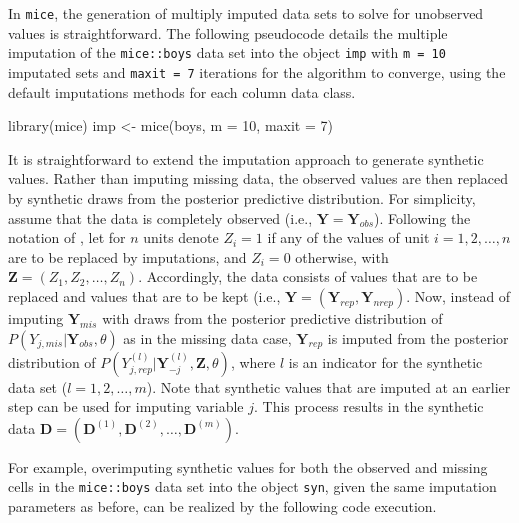 \documentclass[psych,article,submit,moreauthors,pdftex]{mdpi}
\newenvironment{Shaded}{\begin{snugshade}}{\end{snugshade}}
\newcommand{\AttributeTok}[1]{\textcolor[rgb]{0.77,0.63,0.00}{#1}}
\newcommand{\DecValTok}[1]{\textcolor[rgb]{0.00,0.00,0.81}{#1}}
\newcommand{\FunctionTok}[1]{\textcolor[rgb]{0.00,0.00,0.00}{#1}}
\newcommand{\NormalTok}[1]{#1}
\newcommand{\OtherTok}[1]{\textcolor[rgb]{0.56,0.35,0.01}{#1}}
\begin{document}
In \texttt{mice}, the generation of multiply imputed data sets to solve
for unobserved values is straightforward. The following pseudocode
details the multiple imputation of the \texttt{mice::boys} data set
\citep{fredriks_boys_2000} into the object \texttt{imp} with
\texttt{m\ =\ 10} imputated sets and \texttt{maxit\ =\ 7} iterations for
the algorithm to converge, using the default imputations methods for
each column data class.

\begin{Shaded}
\begin{Highlighting}[]
\FunctionTok{library}\NormalTok{(mice)}
\NormalTok{imp }\OtherTok{\textless{}{-}} \FunctionTok{mice}\NormalTok{(boys, }
            \AttributeTok{m =} \DecValTok{10}\NormalTok{,}
            \AttributeTok{maxit =} \DecValTok{7}\NormalTok{)}
\end{Highlighting}
\end{Shaded}

It is straightforward to extend the imputation approach to generate
synthetic values. Rather than imputing missing data, the observed values
are then replaced by synthetic draws from the posterior predictive
distribution. For simplicity, assume that the data is completely
observed (i.e., \(\textbf{Y} = \textbf{Y}_{obs}\)). Following the
notation of \citet{reiter_raghunathan_multiple_2007}, let for \(n\)
units denote \(Z_i = 1\) if any of the values of unit
\(i = 1, 2, \dots, n\) are to be replaced by imputations, and
\(Z_i = 0\) otherwise, with \(\textbf{Z} = (Z_1, Z_2, \dots, Z_n)\).
Accordingly, the data consists of values that are to be replaced and
values that are to be kept (i.e.,
\(\textbf{Y} = (\textbf{Y}_{rep}, \textbf{Y}_{nrep})\). Now, instead of
imputing \(\textbf{Y}_{mis}\) with draws from the posterior predictive
distribution of \(P(Y_{j, mis} | \textbf{Y}_{obs}, \theta)\) as in the
missing data case, \(\textbf{Y}_{rep}\) is imputed from the posterior
distribution of
\(P(Y^{(l)}_{j, rep} | \textbf{Y}^{(l)}_{-j}, \textbf{Z}, \theta)\),
where \(l\) is an indicator for the synthetic data set
(\(l = 1, 2, \dots, m\)). Note that synthetic values that are imputed at
an earlier step can be used for imputing variable \(j\). This process
results in the synthetic data
\(\textbf{D} = (\textbf{D}^{(1)}, \textbf{D}^{(2)}, \dots, \textbf{D}^{(m)})\).

For example, overimputing synthetic values for both the observed and
missing cells in the \texttt{mice::boys} data set into the object
\texttt{syn}, given the same imputation parameters as before, can be
realized by the following code execution.
\end{document}
